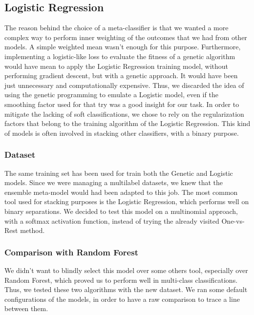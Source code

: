 \subsection{Logistic Regression}
The reason behind the choice of a meta-classifier is that we wanted a more complex way to perform inner weighting of the outcomes that we had from other models.
A simple weighted mean wasn't enough for this purpose. Furthermore, implementing a logistic-like loss to evaluate the fitness of a genetic algorithm would have mean to apply the Logistic Regression training model, without performing gradient descent, but with a genetic approach. It would have been just unnecessary and computationally expensive.
Thus, we discarded the idea of using the genetic programming to emulate a Logistic model, even if the smoothing factor used for that try was a good insight for our task.
In order to mitigate the lacking of soft classifications, we chose to rely on the regularization factors that belong to the training algorithm of the Logistic Regression.
This kind of models is often involved in stacking other classifiers, with a binary purpose.

\subsubsection{Dataset}
The same training set has been used for train both the Genetic and Logistic models.
Since we were managing a multilabel datasets, we knew that the ensemble meta-model would had been adapted to this job. The most common tool used for stacking purposes is the Logistic Regression, which performs well on binary separations. We decided to test this model on a multinomial approach, with a softmax activation function, instead of trying the already visited One-vs-Rest method.

\subsubsection{Comparison with Random Forest}
We didn't want to blindly select this model over some others tool, especially over Random Forest, which proved us to perform well in multi-class classifications.
Thus, we tested these two algorithms with the new dataset.
We ran some default configurations of the models, in order to have a raw comparison to trace a line between them.


